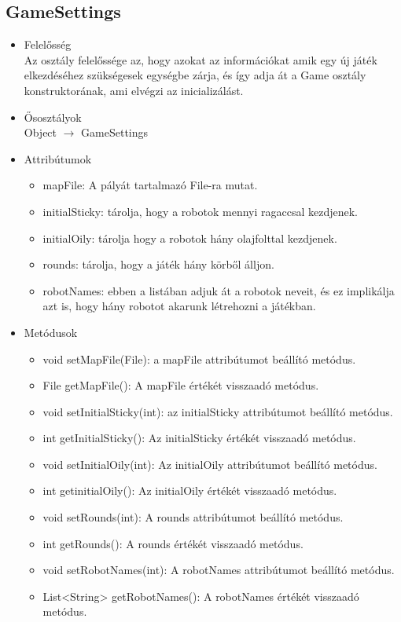 \subsection{GameSettings}
\begin{itemize}
	\item Felelősség\\
	Az osztály felelőssége az, hogy azokat az információkat amik egy új játék elkezdéséhez szükségesek egységbe zárja, és így adja át a Game osztály konstruktorának, ami elvégzi az inicializálást.
	\item Ősosztályok\\
		Object $\rightarrow$ GameSettings
	\item Attribútumok\\
	\begin{itemize}
		\item mapFile: A pályát tartalmazó File-ra mutat.
		\item initialSticky: tárolja, hogy a robotok mennyi ragaccsal kezdjenek.
		\item initialOily: tárolja hogy a robotok hány olajfolttal kezdjenek.
		\item rounds: tárolja, hogy a játék hány körből álljon.
		\item robotNames: ebben a listában adjuk át a robotok neveit, és ez implikálja azt is, hogy hány robotot akarunk létrehozni a játékban.
	\end{itemize}
	\item Metódusok\\
	\begin{itemize}
		\item void setMapFile(File): a mapFile attribútumot beállító metódus.
		\item File getMapFile(): A mapFile értékét visszaadó metódus.
		\item void setInitialSticky(int): az initialSticky attribútumot beállító metódus.
		\item int getInitialSticky(): Az initialSticky értékét visszaadó metódus.
		\item void setInitialOily(int): Az initialOily attribútumot beállító metódus.
		\item int getinitialOily(): Az initialOily értékét visszaadó metódus.
		\item void setRounds(int): A rounds attribútumot beállító metódus.
		\item int getRounds(): A rounds értékét visszaadó metódus.
		\item void setRobotNames(int): A robotNames attribútumot beállító metódus.
		\item List<String> getRobotNames(): A robotNames értékét visszaadó metódus.
	\end{itemize}
\end{itemize}

